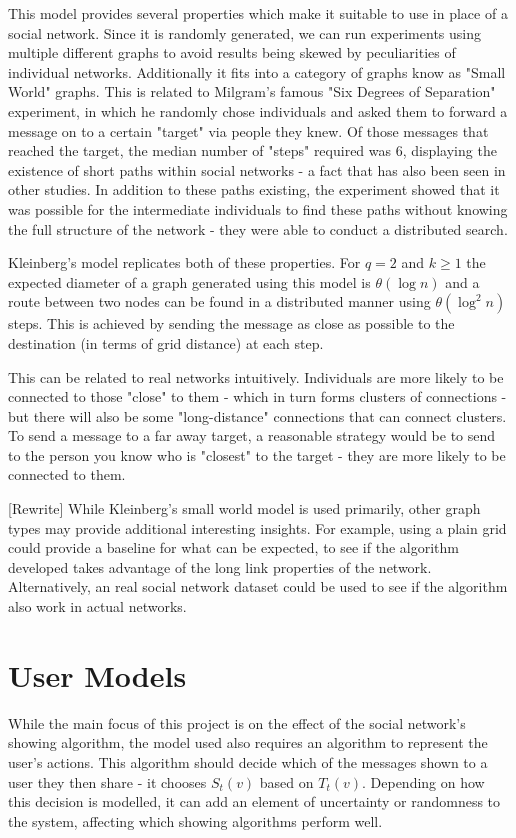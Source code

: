 \documentclass[bsc,frontabs,twoside,singlespacing,parskip,deptreport]{infthesis}     %
\begin{document}
This model provides several properties which make it suitable to use in place of a social network. Since it is randomly generated, we can run experiments using multiple different graphs to avoid results being skewed by peculiarities of individual networks. Additionally it fits into a category of graphs know as "Small World" graphs. This is related to Milgram's famous "Six Degrees of Separation" experiment\cite{Milgram67,TraversMilgram69}, in which he randomly chose individuals and asked them to forward a message on to a certain "target" via people they knew. Of those messages that reached the target, the median number of "steps" required was 6, displaying the existence of short paths within social networks - a fact that has also been seen in other studies\cite{MilgramBackup1,MilgramBackup2}. In addition to these paths existing, the experiment showed that it was possible for the intermediate individuals to find these paths without knowing the full structure of the network - they were able to conduct a distributed search. 

Kleinberg's model replicates both of these properties. For $q = 2$ and $k \ge 1$ the expected diameter of a graph generated using this model is $\theta (\log n)$ and a route between two nodes can be found in a distributed manner using $\theta (\log^{2}n)$ steps\cite{AnalyzingKleinberg}. This is achieved by sending the message as close as possible to the destination (in terms of grid distance) at each step.

This can be related to real networks intuitively. Individuals are more likely to be connected to those "close" to them - which in turn forms clusters of connections - but there will also be some "long-distance" connections that can connect clusters. To send a message to a far away target, a reasonable strategy would be to send to the person you know who is "closest" to the target - they are more likely to be connected to them.

[Rewrite] While Kleinberg's small world model is used primarily, other graph types may provide additional interesting insights. For example, using a plain grid could provide a baseline for what can be expected, to see if the algorithm developed takes advantage of the long link properties of the network. Alternatively, an real social network dataset could be used to see if the algorithm also work in actual networks.

\section{User Models} \label{sec:user_models}
While the main focus of this project is on the effect of the social network's showing algorithm, the model used also requires an algorithm to represent the user's actions. This algorithm should decide which of the messages shown to a user they then share - it chooses $S_{t}(v)$ based on $T_{t}(v)$. Depending on how this decision is modelled, it can add an element of uncertainty or randomness to the system, affecting which showing algorithms perform well.
\end{document}
